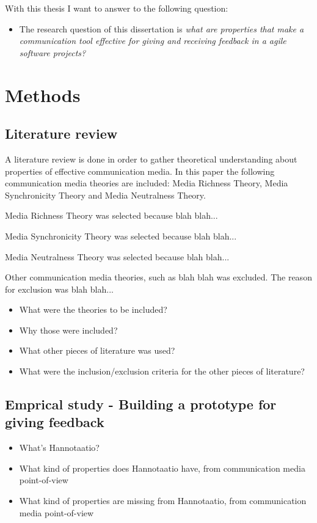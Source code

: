\documentclass[english,12pt,a4paper,pdftex]{article}
\begin{document}
With this thesis I want to answer to the following question:

\begin{itemize}
\item The research question of this dissertation is \textit{what are properties that make a communication tool effective for giving and receiving feedback in a agile software projects?}
\end{itemize}

\clearpage

\section{Methods}

\subsection{Literature review}

A literature review is done in order to gather theoretical understanding about properties of effective communication media. In this paper the following communication media theories are included: Media Richness Theory, Media Synchronicity Theory and Media Neutralness Theory. 

Media Richness Theory was selected because blah blah...

Media Synchronicity Theory was selected because blah blah...

Media Neutralness Theory was selected because blah blah...

Other communication media theories, such as blah blah was excluded. The reason for exclusion was blah blah...

\begin{itemize}
\item What were the theories to be included?
\item Why those were included?
\item What other pieces of literature was used?
\item What were the inclusion/exclusion criteria for the other pieces of literature?
\end{itemize}

\subsection{Emprical study - Building a prototype for giving feedback}

\begin{itemize}
\item What's Hannotaatio?
\item What kind of properties does Hannotaatio have, from communication media point-of-view
\item What kind of properties are missing from Hannotaatio, from communication media point-of-view
\end{itemize}
\end{document}
